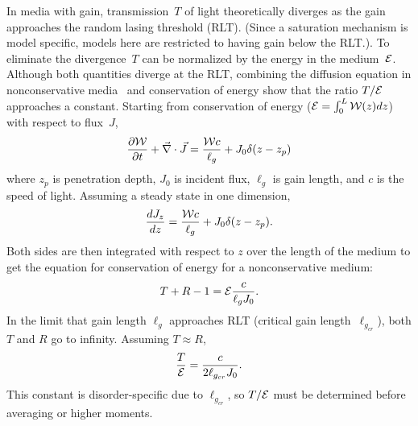 In media with gain, transmission~$T$ of light theoretically diverges as the gain approaches the random lasing threshold (RLT). (Since a saturation mechanism is model specific, models here are restricted to having gain below the RLT.). To eliminate the divergence~$T$ can be normalized by the energy in the medium~${\cal E}$. Although both quantities diverge at the RLT, combining the diffusion equation in nonconservative media~\cite{2010_Payne_TE} and conservation of energy show that the ratio $T/{\cal E}$ approaches a constant. Starting from conservation of energy \mbox{(${\cal E} =\int_0^L{\cal W}(z)dz$)} with respect to flux~$J$,
\begin{equation}
\frac{\partial {\cal W}}{\partial t} + \vec{\nabla} \cdot \vec{J} = \frac{{\cal W} c}{\ell_g} + J_0 \delta(z-z_p)
\label{eq:conservation_flux}
\end{equation}
where $z_p$ is penetration depth, $J_0$ is incident flux, $\ell_g$ is gain length, and $c$ is the speed of light. Assuming a steady state in one dimension, 
\begin{equation}
\frac{d J_z}{dz} = \frac{{\cal W} c}{\ell_g} + J_0 \delta(z-z_p).
\label{eq:oned_no_time_JW}
\end{equation}
Both sides are then integrated with respect to $z$ over the length of the medium to get the equation for conservation of energy for a nonconservative medium:
\begin{equation}
T + R -1 = {\cal E} \frac{c}{\ell_g J_0}.
\label{eq:conservation_energy_active_medium}
\end{equation}
In the limit that gain length $\ell_g$ approaches RLT (critical gain length~$\ell_{g_{cr}}$), both $T$ and $R$ go to infinity. Assuming $T \approx R$,
\begin{equation}
\frac{T}{{\cal E}} = \frac{c}{2 \ell_{g_{cr}}J_0}.
\label{eq:TE_RLT_limit}
\end{equation}
This constant is disorder-specific due to $\ell_{g_{cr}}$, so $T/{\cal E}$ must be determined before averaging or higher moments.

